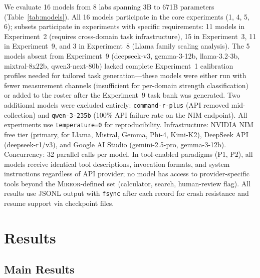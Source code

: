 \documentclass[10pt]{article}
\newcommand{\mirror}{\textsc{Mirror}}
\begin{document}


We evaluate 16 models from 8 labs spanning 3B to 671B parameters
(Table~\ref{tab:models}). All 16 models participate in the core experiments (1, 4, 5, 6); subsets participate in experiments with specific requirements: 11 models in Experiment~2 (requires cross-domain task infrastructure), 15 in Experiment~3, 11 in Experiment~9, and 3 in Experiment~8 (Llama family scaling analysis). The 5 models absent from Experiment~9 (deepseek-v3, gemma-3-12b, llama-3.2-3b, mixtral-8x22b, qwen3-next-80b) lacked complete Experiment~1 calibration profiles needed for tailored task generation---these models were either run with fewer measurement channels (insufficient for per-domain strength classification) or added to the roster after the Experiment~9 task bank was generated. Two additional models were excluded entirely:
\texttt{command-r-plus} (API removed mid-collection) and \texttt{qwen-3-235b}
(100\% API failure rate on the NIM endpoint). All experiments use
\texttt{temperature=0} for reproducibility. Infrastructure: NVIDIA NIM free tier
(primary, for Llama, Mistral, Gemma, Phi-4, Kimi-K2), DeepSeek API
(deepseek-r1/v3), and Google AI Studio (gemini-2.5-pro, gemma-3-12b).
Concurrency: 32 parallel calls per model.
In tool-enabled paradigms (P1, P2), all models receive identical tool descriptions,
invocation formats, and system instructions regardless of API provider; no model
has access to provider-specific tools beyond the \mirror{}-defined set
(calculator, search, human-review flag). All results use JSONL output with
\texttt{fsync} after each record for crash resistance and resume support via
checkpoint files.

\section{Results}
\label{sec:results}

\subsection{Main Results}
\end{document}
